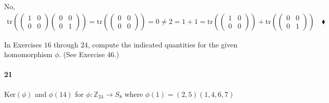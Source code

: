 \documentclass{article}
\newcommand\Z{\mathbb{Z}}
\begin{document}
 No,
\begin{align*}
  \text{tr}\left(\begin{pmatrix}1&0\\
  0&0\end{pmatrix}\begin{pmatrix}0&0\\ 0&1\end{pmatrix}\right) = \text{tr}\left(\begin{pmatrix}0&0\\
  0&0\end{pmatrix}\right)
                                 = 0 \neq 2
                                 = 1 + 1
                                 = \text{tr}\left(\begin{pmatrix}1&0\\
  0&0\end{pmatrix}\right) + \text{tr}\left(\begin{pmatrix}0&0\\
  0&1\end{pmatrix}\right)\quad \blacklozenge
\end{align*}


In Exercises $16$ through $24$, compute the indicated quantities for
the given homomorphism $\phi$. (See Exercise $46.$)


\paragraph{21} Ker$(\phi)$ and $\phi(14)$ for $\phi: \Z_{24}\rightarrow
S_8$ where $\phi(1) = (2, 5)(1, 4, 6, 7)$
\end{document}

